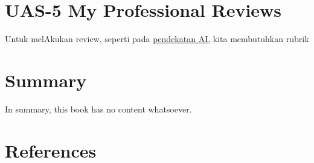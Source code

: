 \documentclass[
  letterpaper,
  DIV=11,
  numbers=noendperiod]{scrreprt}
\begin{document}

\chapter{UAS-5 My Professional
Reviews}\label{uas-5-my-professional-reviews}

Untuk melAkukan review, seperti pada
\href{../My_Personal_Reviews/Doc.5.Mengevaluasi-Esai-Berdasarkan-Rubrik.pdf}{pendekatan
AI}, kita membutuhkan rubrik


\chapter{Summary}\label{summary}

In summary, this book has no content whatsoever.


\chapter*{References}\label{references}


\label{refs}
\end{document}
